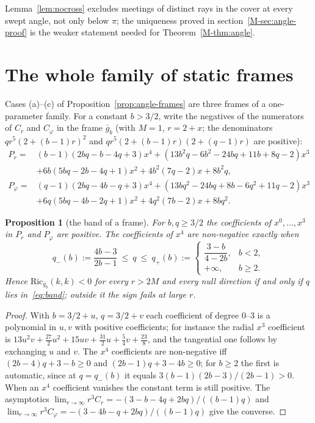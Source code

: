 \documentclass[aip,jmp,amsmath,amssymb,reprint]{revtex4-2}
\theoremstyle{plain}
\newtheorem{proposition}{Proposition}[section]
\theoremstyle{definition}
\begin{document}
Lemma~\ref{lem:nocross} excludes meetings of distinct rays in the cover at every swept
angle, not only below $\pi$; the uniqueness proved in section~\ref{M-sec:angle-proof} is the
weaker statement needed for Theorem~\ref{M-thm:angle}.

\section{The whole family of static frames}
\label{sec:family}
Cases (a)--(c) of Proposition~\ref{prop:angle-frames} are three frames of a one-parameter family. For a
constant $b>3/2$, write the negatives of the numerators of $C_r$ and $C_\varphi$ in the frame
$\bar g_b$ (with $M=1$, $r=2+x$; the denominators $qr^5(2+(b-1)r)^2$ and
$qr^5(2+(b-1)r)(2+(q-1)r)$ are positive):
\begin{align*}
P_r={}&(b-1)(2bq-b-4q+3)x^4+(13b^2q-6b^2-24bq+11b+8q-2)x^3\\
&+6b(5bq-2b-4q+1)x^2+4b^2(7q-2)x+8b^2q,\\
P_\varphi={}&(q-1)(2bq-4b-q+3)x^4+(13bq^2-24bq+8b-6q^2+11q-2)x^3\\
&+6q(5bq-4b-2q+1)x^2+4q^2(7b-2)x+8bq^2 .
\end{align*}

\begin{proposition}[the band of a frame]\label{prop:family}
For $b,q\ge3/2$ the coefficients of $x^0,\dots,x^3$ in $P_r$ and $P_\varphi$ are positive.
The coefficients of $x^4$ are non-negative exactly when
\begin{equation}
  q_-(b):=\frac{4b-3}{2b-1}\ \le\ q\ \le\ q_+(b):=
  \begin{cases}\dfrac{3-b}{4-2b},& b<2,\\[1ex] +\infty,& b\ge2.\end{cases}
  \label{eq:band}
\end{equation}
Hence $\mathrm{Ric}_{\bar g_b}(k,k)<0$ for every $r>2M$ and every null direction if and only
if $q$ lies in~\eqref{eq:band}; outside it the sign fails at large $r$.
\end{proposition}

\begin{proof}
With $b=3/2+u$, $q=3/2+v$ each coefficient of degree $0$--$3$ is a polynomial in $u,v$ with
positive coefficients; for instance the radial $x^3$ coefficient is
$13u^2v+\tfrac{27}{2}u^2+15uv+\tfrac{31}{2}u+\tfrac54v+\tfrac{23}{8}$, and the tangential one
follows by exchanging $u$ and $v$. The $x^4$ coefficients are non-negative iff
$(2b-4)q+3-b\ge0$ and $(2b-1)q+3-4b\ge0$; for $b\ge2$ the first is automatic, since at
$q=q_-(b)$ it equals $3(b-1)(2b-3)/(2b-1)>0$. When an $x^4$ coefficient vanishes the
constant term is still positive. The asymptotics
$\lim_{r\to\infty}r^3C_r=-(3-b-4q+2bq)/((b-1)q)$ and
$\lim_{r\to\infty}r^3C_\varphi=-(3-4b-q+2bq)/((b-1)q)$ give the converse.
\end{proof}
\end{document}
